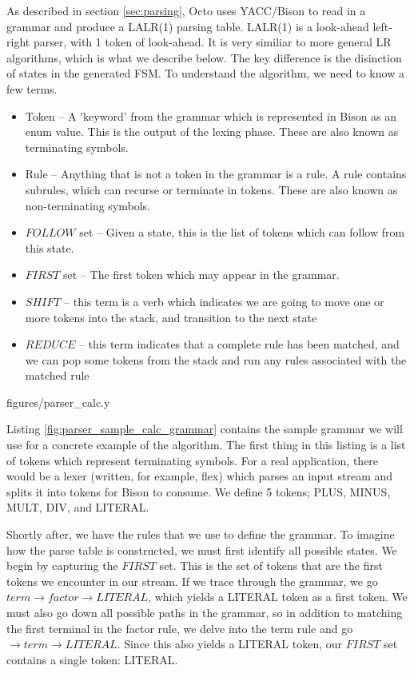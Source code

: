 \documentclass[]{article}
\begin{document}
As described in section \ref{sec:parsing}, Octo uses YACC/Bison to read in a grammar and produce a LALR(1) parsing table.
LALR(1) is a look-ahead left-right parser, with 1 token of look-ahead.
It is very similiar to more general LR algorithms, which is what we describe below.
The key difference is the disinction of states in the generated FSM.
To understand the algorithm, we need to know a few terms.

\begin{itemize}
	\item Token -- A 'keyword' from the grammar which is represented in Bison as an enum value. This is the output of the lexing phase. These are also known as terminating symbols.
	\item Rule -- Anything that is not a token in the grammar is a rule. A rule contains subrules, which can recurse or terminate in tokens. These are also known as non-terminating symbols.
	\item $FOLLOW$ set -- Given a state, this is the list of tokens which can follow from this state.
	\item $FIRST$ set -- The first token which may appear in the grammar.
	\item $SHIFT$ -- this term is a verb which indicates we are going to move one or more tokens into the stack, and transition to the next state
	\item $REDUCE$ -- this term indicates that a complete rule has been matched, and we can pop some tokens from the stack and run any rules associated with the matched rule
\end{itemize}


{figures/parser_calc.y}

Listing \ref{fig:parser_sample_calc_grammar} contains the sample grammar we will use for a concrete example of the algorithm.
The first thing in this listing is a list of tokens which represent terminating symbols.
For a real application, there would be a lexer (written, for example, flex) which parses an input stream and splits it into tokens for Bison to consume.
We define 5 tokens; PLUS, MINUS, MULT, DIV, and LITERAL.

Shortly after, we have the rules that we use to define the grammar.
To imagine how the parse table is constructed, we must first identify all possible states.
We begin by capturing the $FIRST$ set.
This is the set of tokens that are the first tokens we encounter in our stream.
If we trace through the grammar, we go $term \rightarrow factor \rightarrow LITERAL$, which yields a LITERAL token as a first token.
We must also go down all possible paths in the grammar, so in addition to matching the first terminal in the factor rule, we delve into the term rule and go $\rightarrow term \rightarrow LITERAL$.
Since this also yields a LITERAL token, our $FIRST$ set contains a single token: LITERAL.
\end{document}
